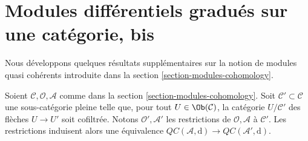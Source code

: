 \section{Modules différentiels gradués sur une catégorie, bis}
\label{section-modules-cohomology-bis}

\noindent
Nous développons quelques résultats supplémentaires sur la notion de modules
quasi cohérents introduite dans la section \ref{section-modules-cohomology}.

\begin{lemma}
\label{lemma-cartesian-cofinal-subcategory}
Soient $\mathcal{C}, \mathcal{O}, \mathcal{A}$ comme
dans la section \ref{section-modules-cohomology}.
Soit $\mathcal{C}' \subset \mathcal{C}$ une sous-catégorie
pleine telle que, pour tout $U \in \Ob(\mathcal{C})$, la catégorie
$U/\mathcal{C}'$ des flèches $U \to U'$ soit cofiltrée. Notons
$\mathcal{O}', \mathcal{A}'$ les restrictions de
$\mathcal{O}, \mathcal{A}$ à $\mathcal{C}'$. Les
restrictions induisent alors une équivalence
$\mathit{QC}(\mathcal{A}, \text{d}) \to \mathit{QC}(\mathcal{A}', \text{d})$.
\end{lemma}

